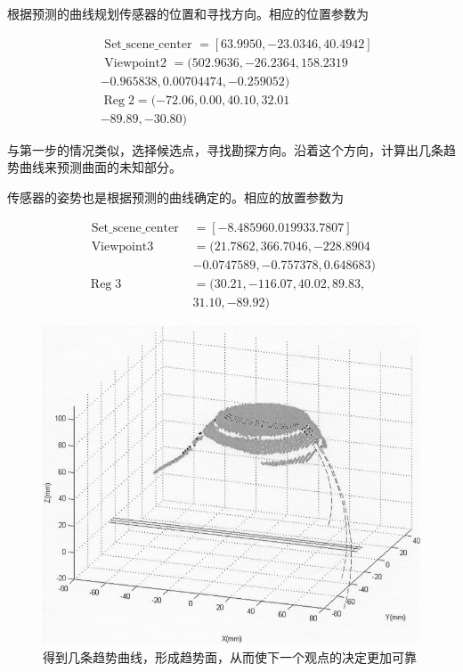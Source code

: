\documentclass[AutoFakeBold,zihao=-4]{ctexart}
\begin{document}
	根据预测的曲线规划传感器的位置和寻找方向。相应的位置参数为
	
	\begin{equation*}
		\begin{aligned}
			&\text { Set\_scene\_center }=[63.9950,-23.0346,40.4942] \\
			&\text { Viewpoint2 }=(502.9636,-26.2364,158.2319\\
			&-0.965838,0.00704474,-0.259052) \\
			&\operatorname{Reg} 2=(-72.06,0.00,40.10,32.01\\
			&-89.89,-30.80)
		\end{aligned}
	\end{equation*}

	与第一步的情况类似，选择候选点，寻找勘探方向。沿着这个方向，计算出几条趋势曲线来预测曲面的未知部分。
	
	传感器的姿势也是根据预测的曲线确定的。相应的放置参数为
	
	\begin{equation*}
		\begin{aligned}
			\text { Set\_scene\_center }&=[-8.485960 .019933 .7807] \\
			\text { Viewpoint3 }&=(21.7862,366.7046,-228.8904\\
			&-0.0747589,-0.757378,0.648683) \\
			\operatorname{Reg} 3&=(30.21,-116.07,40.02,89.83,\\
			&31.10,-89.92)
		\end{aligned}
	\end{equation*}
	
	\begin{figure}[H]
		\centering
		\includegraphics[scale=0.4]{PIC10}
		\caption{得到几条趋势曲线，形成趋势面，从而使下一个观点的决定更加可靠}
		\label{fig-10}
	\end{figure}
\end{document}
